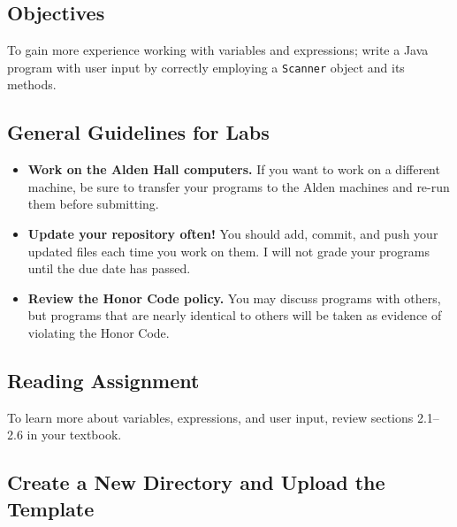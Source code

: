 



\vspace{-0.15in}
\subsection*{Objectives}

To gain more experience working with variables and expressions; write a Java program with user input by correctly
employing a {\tt Scanner} object and its methods.

\vspace{-0.15in}
\subsection*{General Guidelines for Labs}
\begin{itemize}
\item
{\bf Work on the Alden Hall computers.} If you want to work on a different
machine, be sure to transfer your programs to the Alden
machines and re-run them before submitting.
\item
{\bf Update your repository often!} You should add, commit, 
and push your updated files each time you work on them.  I will not grade 
your programs until the due date has passed.
\item
{\bf Review the Honor Code policy.} You
may discuss programs with others, but programs that are nearly identical
to others will be taken as evidence of violating the Honor Code.
\end{itemize}

\vspace{-0.15in}
\subsection*{Reading Assignment}

To learn more about variables, expressions, and user input, review sections 2.1--2.6 in your textbook. 

\vspace{-0.15in}
\subsection*{Create a New Directory and Upload the Template}

